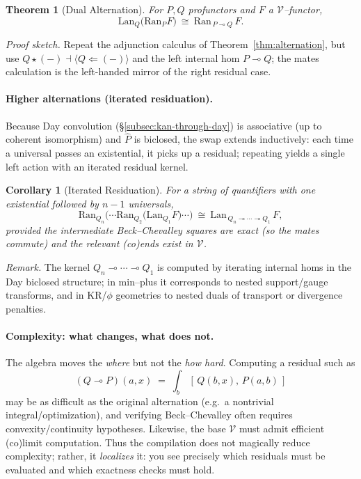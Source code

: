 \documentclass[11pt]{article}
\numberwithin{equation}{section}
\theoremstyle{upright}
\newtheorem{theorem}{Theorem}
\newtheorem{corollary}{Corollary}
\newcommand{\V}{\mathcal{V}}
\newcommand{\Lan}{\mathrm{Lan}}
\newcommand{\Ran}{\mathrm{Ran}}
\begin{document}
\begin{theorem}[Dual Alternation]\label{thm:dual-alternation}
For $P,Q$ profunctors and $F$ a $\V$--functor,
\[
\Lan_Q\!\big(\Ran_P F\big)\ \cong\ \Ran_{\,P \multimap Q}\,F.
\]
\end{theorem}

\noindent\emph{Proof sketch.}
Repeat the adjunction calculus of Theorem~\ref{thm:alternation}, but use $Q\star(-)\dashv \langle Q\Leftarrow(-)\rangle$ and the left internal hom $P\multimap Q$; the mates calculation is the left-handed mirror of the right residual case.

\paragraph{Higher alternations (iterated residuation).}
Because Day convolution (\S\ref{subsec:kan-through-day}) is associative (up to coherent isomorphism) and $\widehat P$ is biclosed, the swap extends inductively: each time a universal passes an existential, it picks up a residual; repeating yields a single left action with an iterated residual kernel.

\begin{corollary}[Iterated Residuation]\label{cor:iterated-residuation}
For a string of quantifiers with one existential followed by $n{-}1$ universals,
\[
\Ran_{Q_n}\Big(\cdots\Ran_{Q_2}\big(\Lan_{Q_1} F\big)\cdots\Big)
\ \cong\
\Lan_{\,Q_n \multimap \cdots \multimap Q_1}\,F,
\]
provided the intermediate Beck--Chevalley squares are exact (so the mates commute) and the relevant (co)ends exist in $\V$.
\end{corollary}

\noindent\emph{Remark.}
The kernel $Q_n \multimap \cdots \multimap Q_1$ is computed by iterating internal homs in the Day biclosed structure; in min–plus it corresponds to nested support/gauge transforms, and in KR/$\phi$ geometries to nested duals of transport or divergence penalties.

\paragraph{Complexity: what changes, what does not.}
The algebra moves the \emph{where} but not the \emph{how hard}. Computing a residual such as
\[
(Q\multimap P)(a,x)\;=\;\int_{b}\,[\,Q(b,x),\,P(a,b)\,]
\]
may be as difficult as the original alternation (e.g.\ a nontrivial integral/optimization), and verifying Beck--Chevalley often requires convexity/continuity hypotheses. Likewise, the base $\V$ must admit efficient (co)limit computation. Thus the compilation does not magically reduce complexity; rather, it \emph{localizes} it: you see precisely which residuals must be evaluated and which exactness checks must hold.
\end{document}
